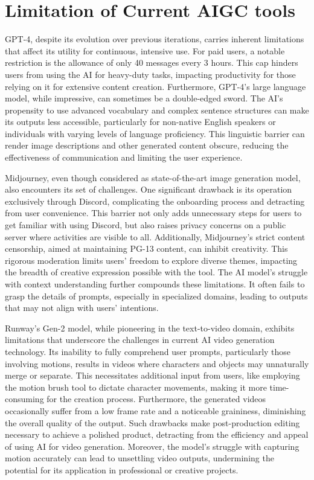 \documentclass[11pt,a4paper,oneside]{report}
\begin{document}


\section{Limitation of Current AIGC tools}

GPT-4, despite its evolution over previous iterations, carries inherent limitations that affect its utility for continuous, intensive use. 
For paid users, a notable restriction is the allowance of only 40 messages every 3 hours. 
This cap hinders users from using the AI for heavy-duty tasks, impacting productivity for those relying on it for extensive content creation.
Furthermore, GPT-4's large language model, while impressive, can sometimes be a double-edged sword. 
The AI's propensity to use advanced vocabulary and complex sentence structures can make its outputs less accessible, particularly for non-native English speakers or individuals with varying levels of language proficiency. 
This linguistic barrier can render image descriptions and other generated content obscure, reducing the effectiveness of communication and limiting the user experience.

Midjourney, even though considered as state-of-the-art image generation model, also encounters its set of challenges. 
One significant drawback is its operation exclusively through Discord, complicating the onboarding process and detracting from user convenience. 
This barrier not only adds unnecessary steps for users to get familiar with using Discord, but also raises privacy concerns on a public server where activities are visible to all. 
Additionally, Midjourney's strict content censorship, aimed at maintaining PG-13 content, can inhibit creativity. 
This rigorous moderation limits users' freedom to explore diverse themes, impacting the breadth of creative expression possible with the tool. 
The AI model's struggle with context understanding further compounds these limitations. 
It often fails to grasp the details of prompts, especially in specialized domains, leading to outputs that may not align with users' intentions.

Runway's Gen-2 model, while pioneering in the text-to-video domain, exhibits limitations that underscore the challenges in current AI video generation technology. 
Its inability to fully comprehend user prompts, particularly those involving motions, results in videos where characters and objects may unnaturally merge or separate. 
This necessitates additional input from users, like employing the motion brush tool to dictate character movements, making it more time-consuming for the creation process. 
Furthermore, the generated videos occasionally suffer from a low frame rate and a noticeable graininess, diminishing the overall quality of the output. 
Such drawbacks make post-production editing necessary to achieve a polished product, detracting from the efficiency and appeal of using AI for video generation. 
Moreover, the model's struggle with capturing motion accurately can lead to unsettling video outputs, undermining the potential for its application in professional or creative projects.
\end{document}
